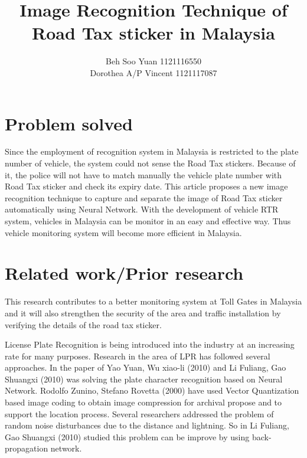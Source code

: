 \documentclass[12pt]{article}
\title{Image Recognition Technique of Road Tax sticker in Malaysia}
\author{Beh Soo Yuan 1121116550\\Dorothea A/P Vincent 1121117087}
\begin{document}
\maketitle
{}

\section{Problem solved}
Since the employment of recognition system in Malaysia is restricted to the plate number of vehicle, the system could not sense the Road Tax stickers. Because of it, the police will not have to match manually the vehicle plate number with Road Tax sticker and check its expiry date. This article proposes a new image recognition technique to capture and separate the image of Road Tax sticker automatically using Neural Network. With the development of vehicle RTR system, vehicles in Malaysia can be monitor in an easy and effective way. Thus vehicle monitoring system will become more efficient in Malaysia. \cite{6516388}

\section{Related work/Prior research}
This research contributes to a better monitoring system at Toll Gates in Malaysia and it will also strengthen the security of the area and traffic installation by verifying the details of the road tax sticker.

License Plate Recognition is being introduced into the industry at an increasing rate for many purposes. Research in the area of LPR has followed several approaches. In the paper of Yao Yuan, Wu xiao-li (2010) and Li Fuliang, Gao Shuangxi (2010) was solving the plate character recognition based on Neural Network.\cite{bpnn}\cite{digitalImg} Rodolfo Zunino, Stefano Rovetta (2000) have used Vector Quantization based image coding to obtain image compression for archival propose and to support the location process.\cite{vq} Several researchers addressed the problem of random noise disturbances due to the distance and lightning. So in Li Fuliang, Gao Shuangxi (2010) studied this problem can be improve by using back- propagation network. 
\end{document}
